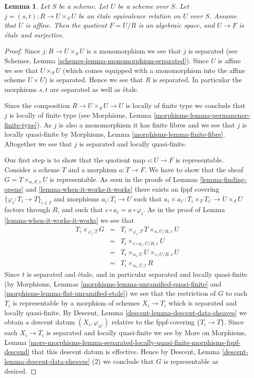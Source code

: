 \documentclass{stacks-project}
\theoremstyle{plain}
\newtheorem{lemma}[subsection]{Lemma}
\theoremstyle{definition}
\theoremstyle{remark}
\numberwithin{equation}{subsection}
\begin{document}
\begin{lemma}
\label{lemma-presentation-quasi-compact}
Let $S$ be a scheme.
Let $U$ be a scheme over $S$.
Let $j = (s, t) : R \to U \times_S U$
be an \'etale equivalence relation on $U$ over $S$.
Assume that $U$ is affine. Then the quotient $F = U/R$
is an algebraic space, and $U \to F$ is \'etale and surjective.
\end{lemma}

\begin{proof}
Since $j : R \to U \times_S U$ is a monomorphism we see that $j$ is separated
(see Schemes, Lemma \ref{schemes-lemma-monomorphism-separated}).
Since $U$ is affine we see that $U \times_S U$
(which comes equipped with a monomorphism into the affine scheme
$U \times U$) is separated. Hence we see that $R$ is separated.
In particular the morphisms $s, t$ are separated as well as \'etale.

\medskip\noindent
Since the composition $R \to U \times_S U \to U$ is
locally of finite type we conclude that
$j$ is locally of finite type (see
Morphisms, Lemma \ref{morphisms-lemma-permanence-finite-type}).
As $j$ is also a monomorphism it has finite fibres and
we see that $j$ is locally quasi-finite by
Morphisms, Lemma \ref{morphisms-lemma-finite-fibre}.
Altogether we see that $j$ is separated and locally quasi-finite.

\medskip\noindent
Our first step is to show that the quotient map
$c : U \to F$ is representable.
Consider a scheme $T$ and a morphism $a : T \to F$.
We have to show that the sheaf $G = T \times_{a, F, c} U$
is representable.
As seen in the proofs of Lemmas \ref{lemma-finding-opens} and
\ref{lemma-when-it-works-it-works} there exists an fppf covering
$\{\varphi_i : T_i \to T\}_{i \in I}$ and morphisms $a_i : T_i \to U$
such that $a_i \times a_{i'} : T_i \times_T T_{i'} \to U \times_S U$
factors through $R$, and such that $c \circ a_i = a \circ \varphi_i$.
As in the proof of Lemma \ref{lemma-when-it-works-it-works} we see that
\begin{eqnarray*}
T_i \times_{\varphi_i, T} G & = &
T_i \times_{\varphi_i, T} T \times_{a, U/R, c} U \\
& = & T_i \times_{c \circ a_i, U/R, c} U \\
& = & T_i \times_{a_i, U} U \times_{c, U/R, c} U \\
& = & T_i \times_{a_i, U, t} R
\end{eqnarray*}
Since $t$ is separated and \'etale, and in particular
separated and locally quasi-finite (by Morphisms, Lemmas
\ref{morphisms-lemma-unramified-quasi-finite} and
\ref{morphisms-lemma-flat-unramified-etale})
we see that the restriction
of $G$ to each $T_i$ is representable by a morphism of schemes
$X_i \to T_i$ which is separated and locally quasi-finite. By
Descent, Lemma \ref{descent-lemma-descent-data-sheaves}
we obtain a descent datum $(X_i, \varphi_{ii'})$ relative
to the fppf-covering $\{T_i \to T\}$. Since each
$X_i \to T_i$ is separated and locally quasi-finite we see by
More on Morphisms, Lemma
\ref{more-morphisms-lemma-separated-locally-quasi-finite-morphisms-fppf-descend}
that this descent datum is effective.
Hence by
Descent, Lemma \ref{descent-lemma-descent-data-sheaves} (2)
we conclude that $G$ is representable as desired.


\end{proof}
\end{document}
